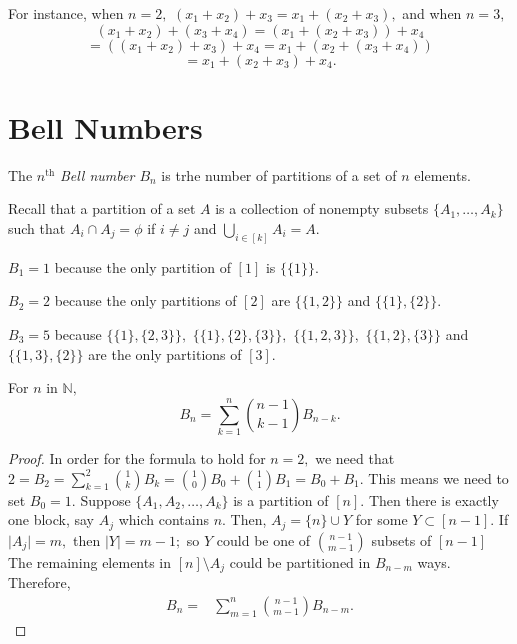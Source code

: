 For instance, when $n=2,$
$(x_1+  x_2) + x_3 = x_1  +(x_2 + x_3),$ and
when $n=3,$ 
$$(x_1 + x_2) + (x_3 + x_4) = (x_1 + (x_2 + x_3)) + x_4 $$
$$ = ((x_1 + x_2) + x_3) + x_4 = x_1 + (x_2 + (x_3 + x_4))$$
$$ = x_1 + (x_2 + x_3 ) +x_4 .$$

\section{Bell Numbers}
\begin{definition}
The $n^\text{th}$ \emph{Bell number $B_n$} is trhe number of partitions
of a set of $n$ elements.
\end{definition}

Recall that a partition of a set $A$ is a collection of nonempty
subsets $ \{ A_1, \dotsc, A_k\}$ such that 
$A_i \cap A_j =  \phi$ if $i \not = j$ and $\bigcup_{i \in [k]} A_i = A.$

\begin{example}
	$B_1 = 1$ because the only partition of $[1]$ is $\{\{1\}\}.$

	$B_2 = 2$ because the only partitions of $[2]$ are
	$\{ \{ 1,2\} \}$ and $\{ \{1\}, \{2\} \}.$

	$B_3 = 5$ because $\{ \{ 1\} , \{ 2, 3\} \},$ 
	$\{ \{1 \}, \{2\}, \{3\}\},$ $\{ \{ 1,2,3\}\},$
	$\{ \{1, 2\}, \{3\}\}$ and $\{ \{1,3\}, \{2\}\}$
	are the only partitions of $[3].$
\end{example}

\begin{lemma}
	For $n$ in $\mathbb{N},$
	$$ B_n = \sum_{k = 1}^{n} \binom{n-1}{k-1} B_{n-k}.$$
\end{lemma}

\begin{proof}
	In order for the formula to hold for $n=2,$ we need that	$2 = B_2 = \sum_{k=1}^{2} \binom{1}{k} B_k
	= \binom{1}{0} B_0 + \binom{1}{1} B_1
	= B_0 + B_1.$
	This means we need to set $B_0 = 1.$
	Suppose $ \{ A_1, A_2, \dotsc, A_k \}$ is a partition of $[n].$
	Then there is exactly one block, say $A_j$ which contains $n.$
	Then, $A_j = \{n\} \cup Y$ for some $ Y \subset [n-1].$
	If $ \lvert A_j \rvert = m,$ then $ \lvert Y \rvert = m-1;$ 
	so $Y$ could be one of $\binom{n-1}{m-1}$ subsets of $[n-1]$
	The remaining elements in $[n] \setminus A_j$ could be 
	partitioned in $B_{n-m}$ ways.
	Therefore,
	\begin{align*}
		B_n ={}&  \sum_{m=1}^{n} \binom{n-1}{m-1} B_{n-m}.
	\end{align*}
\end{proof}


